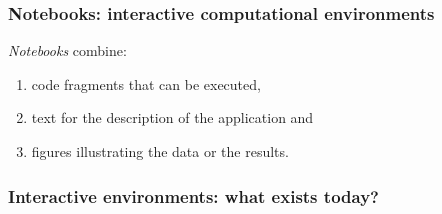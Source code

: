 \begin{frame}[t]
\frametitle{Notebooks: interactive computational environments}

\textit{Notebooks} combine:
\begin{enumerate}
\item code fragments that can be executed, 
\item text for the description of the application and 
\item figures illustrating the data or the results.
\end{enumerate}




\end{frame}




\begin{frame}[t]
\frametitle{Interactive environments: what exists today?}


\end{frame}




